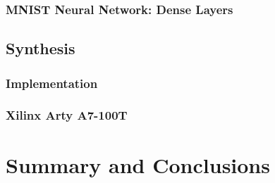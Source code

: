 \documentclass[a4paper,9pt]{report}
\begin{document}

\subsection{MNIST Neural Network: Dense Layers}

\section{Synthesis}
\subsection{Implementation}
\subsection{Xilinx Arty A7-100T}

\chapter{Summary and Conclusions} 


\appendix
\singlespacing

 
% 
\end{document}
